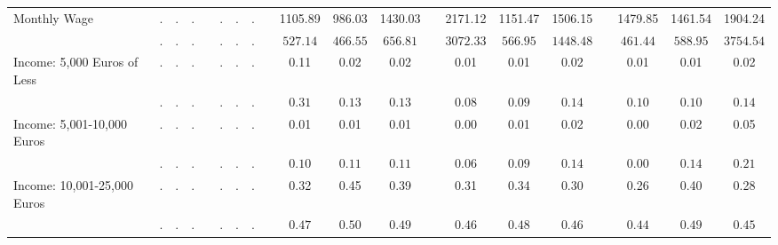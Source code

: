 \begin{center}
{\begin{longtable}{L{5cm} c c c p{.5cm} c c c p{.5cm} c c c p{.5cm} c c c p{.5cm} c c c}
 \quad Monthly Wage & . &         . &         . & &         . &         . &         . & &   1105.89 &    986.03 &   1430.03 & &   2171.12 &   1151.47 &   1506.15 & &   1479.85 &   1461.54 &   1904.24 \\*
 \quad & $\mathit{        .}$ & $\mathit{        .}$ & $\mathit{        .}$ & & $\mathit{        .}$ & $\mathit{        .}$ & $\mathit{        .}$ & & $\mathit{   527.14}$ & $\mathit{   466.55}$ & $\mathit{   656.81}$ & & $\mathit{  3072.33}$ & $\mathit{   566.95}$ & $\mathit{  1448.48}$ & & $\mathit{   461.44}$ & $\mathit{   588.95}$ & $\mathit{  3754.54}$ \\[.2em]
 \quad Income: 5,000 Euros of Less & . &         . &         . & &         . &         . &         . & &      0.11 &      0.02 &      0.02 & &      0.01 &      0.01 &      0.02 & &      0.01 &      0.01 &      0.02 \\*
 \quad & $\mathit{        .}$ & $\mathit{        .}$ & $\mathit{        .}$ & & $\mathit{        .}$ & $\mathit{        .}$ & $\mathit{        .}$ & & $\mathit{     0.31}$ & $\mathit{     0.13}$ & $\mathit{     0.13}$ & & $\mathit{     0.08}$ & $\mathit{     0.09}$ & $\mathit{     0.14}$ & & $\mathit{     0.10}$ & $\mathit{     0.10}$ & $\mathit{     0.14}$ \\[.2em]
 \quad Income: 5,001-10,000 Euros & . &         . &         . & &         . &         . &         . & &      0.01 &      0.01 &      0.01 & &      0.00 &      0.01 &      0.02 & &      0.00 &      0.02 &      0.05 \\*
 \quad & $\mathit{        .}$ & $\mathit{        .}$ & $\mathit{        .}$ & & $\mathit{        .}$ & $\mathit{        .}$ & $\mathit{        .}$ & & $\mathit{     0.10}$ & $\mathit{     0.11}$ & $\mathit{     0.11}$ & & $\mathit{     0.06}$ & $\mathit{     0.09}$ & $\mathit{     0.14}$ & & $\mathit{     0.00}$ & $\mathit{     0.14}$ & $\mathit{     0.21}$ \\[.2em]
 \quad Income: 10,001-25,000 Euros & . &         . &         . & &         . &         . &         . & &      0.32 &      0.45 &      0.39 & &      0.31 &      0.34 &      0.30 & &      0.26 &      0.40 &      0.28 \\*
 \quad & $\mathit{        .}$ & $\mathit{        .}$ & $\mathit{        .}$ & & $\mathit{        .}$ & $\mathit{        .}$ & $\mathit{        .}$ & & $\mathit{     0.47}$ & $\mathit{     0.50}$ & $\mathit{     0.49}$ & & $\mathit{     0.46}$ & $\mathit{     0.48}$ & $\mathit{     0.46}$ & & $\mathit{     0.44}$ & $\mathit{     0.49}$ & $\mathit{     0.45}$ \\[.2em]

\end{longtable}}
\end{center}

